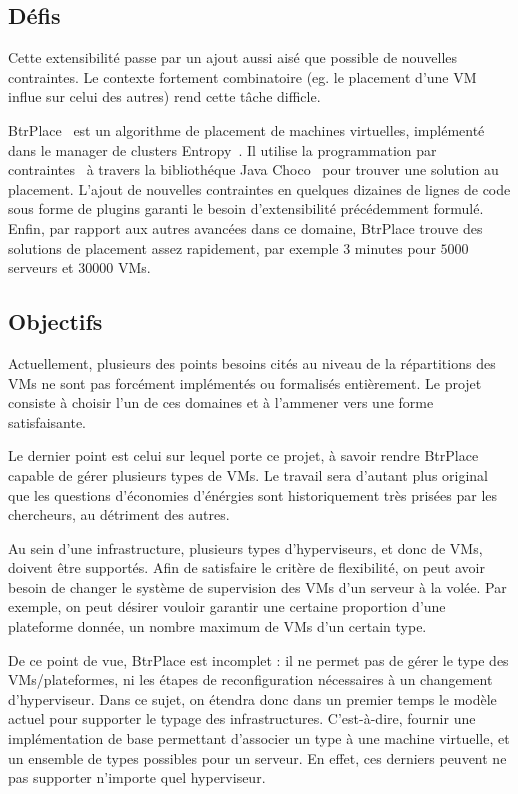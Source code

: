 \documentclass[a4paper]{article}
\begin{document}
\subsection{Défis}
Cette extensibilité passe par un ajout aussi aisé que possible de nouvelles
contraintes. Le contexte fortement combinatoire (eg. le placement d'une VM
influe sur celui des autres) rend cette tâche difficle.

BtrPlace~\cite{herm2012} est un algorithme de placement de machines virtuelles,
implémenté dans le manager de clusters Entropy~\cite{herm2009}. Il utilise la programmation par
contraintes~\cite{rossi-handbook} à travers la bibliothéque Java Choco~\cite{choco}
pour trouver une solution au placement. L'ajout de nouvelles contraintes en quelques dizaines
de lignes de code sous forme de plugins garanti le besoin d'extensibilité précédemment
formulé. Enfin, par rapport aux autres avancées dans ce domaine, BtrPlace trouve
des solutions de placement assez rapidement, par exemple $3$ minutes pour $5000$
serveurs et $30000$ VMs.

\subsection{Objectifs}
Actuellement, plusieurs des points besoins cités au niveau de la répartitions des
VMs ne sont pas forcément implémentés ou formalisés entièrement. Le projet consiste
à choisir l'un de ces domaines et à l'ammener vers une forme satisfaisante.

Le dernier point est celui sur lequel porte ce projet, à savoir rendre BtrPlace
capable de gérer plusieurs types de VMs. Le travail sera
d'autant plus original que les questions d'économies d'énérgies sont historiquement
très prisées par les chercheurs, au détriment des autres.

Au sein d'une infrastructure, plusieurs types d'hyperviseurs, et donc de VMs, doivent
être supportés. Afin de satisfaire le critère de flexibilité, on peut avoir
besoin de changer le système de supervision des VMs d'un serveur à la volée.
Par exemple, on peut désirer vouloir garantir une certaine proportion
d'une plateforme donnée, un nombre maximum de VMs d'un certain type.

De ce point de vue, BtrPlace est incomplet : il ne permet pas de gérer le type
des VMs/plateformes, ni les étapes de reconfiguration nécessaires à un changement
d'hyperviseur. Dans ce sujet, on étendra donc dans un premier temps le modèle actuel
pour supporter le typage des infrastructures. C'est-à-dire, fournir
une implémentation de base permettant d'associer un type à une machine
virtuelle, et un ensemble de types possibles pour un serveur. En effet,
ces derniers peuvent ne pas supporter n'importe quel hyperviseur.
\end{document}
